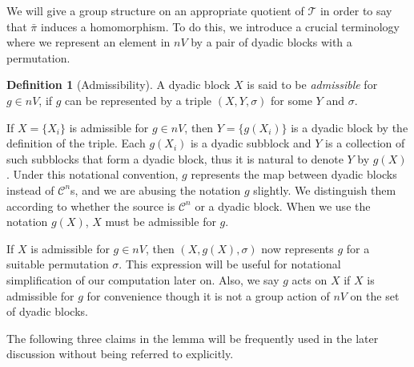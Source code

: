 \documentclass[12pt,reqno]{amsart}
\theoremstyle{plain}
\theoremstyle{definition}
\newtheorem{definition}{Definition}[section]
\theoremstyle{remark}
\numberwithin{equation}{section}
\begin{document}
We will give a group structure on an appropriate quotient of  $\mathcal{T}$ 
in order to say that  $\bar{\pi}$  induces  a homomorphism. 
To do this, 
we introduce a crucial terminology 
where we represent 
an element in  $nV$  by a pair of dyadic blocks with a permutation.

\begin{definition}[Admissibility]
	A dyadic block  $X$  is said to be 
	{\it admissible} for  $g \in nV$, 
	if  $g$  can be 
	represented by a triple  $(X, Y, \sigma)$  for some  $Y$  and  $\sigma$.  
\end{definition} 

If  $X = \{ X_i \}$  is admissible for  $g \in nV$, 
then  $Y = \{ g(X_i) \}$  is a dyadic block 
by the definition of the triple.  
Each  $g(X_i)$  is a dyadic subblock and  $Y$  is a collection of 
such subblocks that form a dyadic block,  
thus it is natural to denote  $Y$  by  $g(X)$.  
Under this notational convention, 
$g$  represents the map between dyadic blocks instead of  $\mathcal{C}^n$s,    
and we are abusing the notation  $g$  slightly.  
We distinguish them according to whether the source is  $\mathcal{C}^n$  or a dyadic block.  
When we use the notation  $g(X)$, 
$X$  must be admissible for  $g$.    

If  $X$  is admissible for  $g \in nV$, 
then  $(X, g(X), \sigma)$  now represents  $g$  for 
a suitable permutation  $\sigma$.  
This expression will be useful for notational simplification 
of our computation later on.  
Also, 
we say  $g$  acts on  $X$  if  $X$  is admissible for  $g$  for convenience 
though it is not a group action of  $nV$  on the set of dyadic blocks.   

The following three claims in the lemma will be frequently used in the later discussion 
without being referred to explicitly.  
\end{document}
